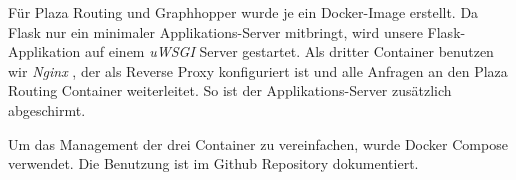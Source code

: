 Für Plaza Routing und Graphhopper wurde je ein Docker-Image erstellt. Da Flask \cite{flask} nur ein minimaler Applikations-Server mitbringt, wird unsere Flask-Applikation auf einem \emph{uWSGI} \cite{uwsgi} Server gestartet. Als dritter Container benutzen wir \emph{Nginx} \cite{nginx}, der als Reverse Proxy konfiguriert ist und alle Anfragen an den Plaza Routing Container weiterleitet. So ist der Applikations-Server zusätzlich abgeschirmt.

Um das Management der drei Container zu vereinfachen, wurde Docker Compose \cite{docker-compose} verwendet. Die Benutzung ist im Github Repository \cite{github:PlazaRoute} dokumentiert.